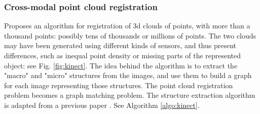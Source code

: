 \documentclass[11pt]{article} %
\begin{document}


    \subsubsection{Cross-modal point cloud registration \cite{huang:kinect}}
Proposes an algorithm for registration of 3d clouds of points, with more than a thousand points: possibly tens of thousands or millions of points. The two clouds may have been generated using different kinds of sensors, and thus present differences, such as inequal point density or missing parts of the represented object: see Fig. \ref{fig:kinect}. The idea behind the algorithm is to extract the "macro" and "micro" structures from the images, and use them to build a graph for each image representing those structures. The point cloud registration problem becomes a graph matching problem. The structure extraction algorithm is adapted from a previous paper \cite{papon:supervoxels}.
See Algorithm \ref{algo:kinect}.
\end{document}

